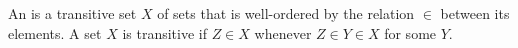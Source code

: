 An  is a transitive set $X$ of sets that is well-ordered by the relation $\in$ between its elements. A set $X$ is transitive if $Z \in X$ whenever $Z \in Y \in X$ for some $Y$.
